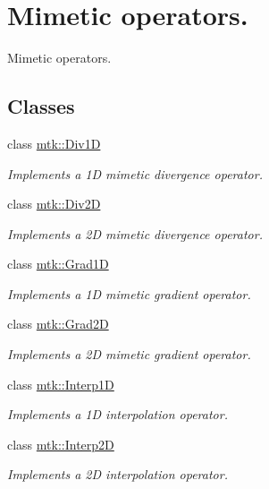 \hypertarget{group__c07-mim__ops}{\section{Mimetic operators.}
\label{group__c07-mim__ops}
}


Mimetic operators.  


\subsection*{Classes}
\begin{DoxyCompactItemize}
\item 
class \hyperlink{classmtk_1_1Div1D}{mtk\+::\+Div1\+D}
\begin{DoxyCompactList}\small\item\em Implements a 1\+D mimetic divergence operator. \end{DoxyCompactList}\item 
class \hyperlink{classmtk_1_1Div2D}{mtk\+::\+Div2\+D}
\begin{DoxyCompactList}\small\item\em Implements a 2\+D mimetic divergence operator. \end{DoxyCompactList}\item 
class \hyperlink{classmtk_1_1Grad1D}{mtk\+::\+Grad1\+D}
\begin{DoxyCompactList}\small\item\em Implements a 1\+D mimetic gradient operator. \end{DoxyCompactList}\item 
class \hyperlink{classmtk_1_1Grad2D}{mtk\+::\+Grad2\+D}
\begin{DoxyCompactList}\small\item\em Implements a 2\+D mimetic gradient operator. \end{DoxyCompactList}\item 
class \hyperlink{classmtk_1_1Interp1D}{mtk\+::\+Interp1\+D}
\begin{DoxyCompactList}\small\item\em Implements a 1\+D interpolation operator. \end{DoxyCompactList}\item 
class \hyperlink{classmtk_1_1Interp2D}{mtk\+::\+Interp2\+D}
\begin{DoxyCompactList}\small\item\em Implements a 2\+D interpolation operator. \end{DoxyCompactList}\item 

\end{DoxyCompactItemize}
